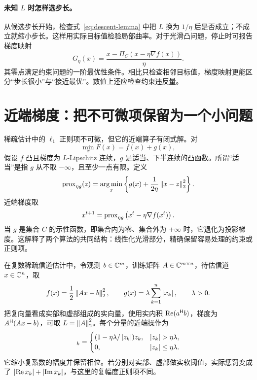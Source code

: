 \paragraph{未知 $L$ 时怎样选步长。}
从候选步长开始，检查式~\eqref{eq:descent-lemma} 中把 $L$ 换为 $1/\eta$ 后是否成立；不成立就缩小步长。这样用实际目标值检验局部曲率。对于光滑凸问题，停止时可报告梯度映射
\begin{equation}
 G_\eta(x)=\frac{x-\Pi_C(x-\eta\nabla f(x))}{\eta}.
\end{equation}
其零点满足约束问题的一阶最优性条件。相比只检查相邻目标值，梯度映射更能区分“步长很小”与“接近最优”。数值上还应检查约束违反量。

\section{近端梯度：把不可微项保留为一个小问题}
稀疏估计中的 $\ell_1$ 正则项不可微，但它的近端算子有闭式解。对
\begin{equation}
 \min_x F(x)=f(x)+g(x),
 \label{eq:composite}
\end{equation}
假设 $f$ 凸且梯度为 $L$-Lipschitz 连续，$g$ 是适当、下半连续的凸函数。所谓“适当”是指 $g$ 从不取 $-\infty$，且至少一点有限。定义
\begin{equation}
 \operatorname{prox}_{\eta g}(z)=\operatorname*{arg\,min}_x\left\{g(x)+\frac1{2\eta}\left\lVert x-z\right\rVert_2^2\right\}.
\end{equation}
近端梯度取
\begin{equation}
 x^{t+1}=\operatorname{prox}_{\eta g}\left(x^t-\eta\nabla f(x^t)\right).
 \label{eq:prox-update}
\end{equation}
当 $g$ 是集合 $C$ 的示性函数，即集合内为零、集合外为 $+\infty$ 时，它退化为投影梯度。这解释了两个算法的共同结构：线性化光滑部分，精确保留容易处理的约束或正则项。

在复数稀疏信道估计中，令观测 $b\in\mathbb C^m$，训练矩阵 $A\in\mathbb C^{m\times n}$，待估信道 $x\in\mathbb C^n$，取
\begin{equation}
 f(x)=\frac12\left\lVert Ax-b\right\rVert_2^2,\qquad
 g(x)=\lambda\sum_{k=1}^n\left\lvert x_k\right\rvert,\qquad \lambda>0.
\end{equation}
把复向量看成实部和虚部组成的实向量，使用实内积 $\operatorname{Re}(a^\mathsf H b)$，梯度为 $A^\mathsf H(Ax-b)$，可取 $L=\left\lVert A\right\rVert_2^2$。每个分量的近端操作为
\begin{equation}
 [\prox_{\eta g}(z)]_k=
 \begin{cases}
 (1-\eta\lambda/\abs{z_k})z_k,&\abs{z_k}>\eta\lambda,\\
 0,&\abs{z_k}\le\eta\lambda.
 \end{cases}
 \label{eq:complex-shrink}
\end{equation}
它缩小复系数的幅度并保留相位。若分别对实部、虚部做实软阈值，实际惩罚变成了 $\left\lvert \operatorname{Re} x_k\right\rvert+\left\lvert \operatorname{Im} x_k\right\rvert$，与这里的复幅度正则项不同。

